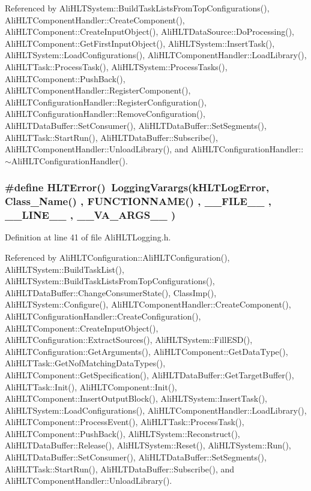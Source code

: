 Referenced by Ali\-HLTSystem::Build\-Task\-Lists\-From\-Top\-Configurations(), Ali\-HLTComponent\-Handler::Create\-Component(), Ali\-HLTComponent::Create\-Input\-Object(), Ali\-HLTData\-Source::Do\-Processing(), Ali\-HLTComponent::Get\-First\-Input\-Object(), Ali\-HLTSystem::Insert\-Task(), Ali\-HLTSystem::Load\-Configurations(), Ali\-HLTComponent\-Handler::Load\-Library(), Ali\-HLTTask::Process\-Task(), Ali\-HLTSystem::Process\-Tasks(), Ali\-HLTComponent::Push\-Back(), Ali\-HLTComponent\-Handler::Register\-Component(), Ali\-HLTConfiguration\-Handler::Register\-Configuration(), Ali\-HLTConfiguration\-Handler::Remove\-Configuration(), Ali\-HLTData\-Buffer::Set\-Consumer(), Ali\-HLTData\-Buffer::Set\-Segments(), Ali\-HLTTask::Start\-Run(), Ali\-HLTData\-Buffer::Subscribe(), Ali\-HLTComponent\-Handler::Unload\-Library(), and Ali\-HLTConfiguration\-Handler::$\sim$Ali\-HLTConfiguration\-Handler().
\subsubsection{\setlength{\rightskip}{0pt plus 5cm}\#define HLTError()\ Logging\-Varargs(k\-HLTLog\-Error,     Class\_\-Name() , FUNCTIONNAME() , \_\-\_\-FILE\_\-\_\- , \_\-\_\-LINE\_\-\_\- , \_\-\_\-VA\_\-ARGS\_\-\_\- )}\label{AliHLTLogging_8h_a6}




Definition at line 41 of file Ali\-HLTLogging.h.

Referenced by Ali\-HLTConfiguration::Ali\-HLTConfiguration(), Ali\-HLTSystem::Build\-Task\-List(), Ali\-HLTSystem::Build\-Task\-Lists\-From\-Top\-Configurations(), Ali\-HLTData\-Buffer::Change\-Consumer\-State(), Class\-Imp(), Ali\-HLTSystem::Configure(), Ali\-HLTComponent\-Handler::Create\-Component(), Ali\-HLTConfiguration\-Handler::Create\-Configuration(), Ali\-HLTComponent::Create\-Input\-Object(), Ali\-HLTConfiguration::Extract\-Sources(), Ali\-HLTSystem::Fill\-ESD(), Ali\-HLTConfiguration::Get\-Arguments(), Ali\-HLTComponent::Get\-Data\-Type(), Ali\-HLTTask::Get\-Nof\-Matching\-Data\-Types(), Ali\-HLTComponent::Get\-Specification(), Ali\-HLTData\-Buffer::Get\-Target\-Buffer(), Ali\-HLTTask::Init(), Ali\-HLTComponent::Init(), Ali\-HLTComponent::Insert\-Output\-Block(), Ali\-HLTSystem::Insert\-Task(), Ali\-HLTSystem::Load\-Configurations(), Ali\-HLTComponent\-Handler::Load\-Library(), Ali\-HLTComponent::Process\-Event(), Ali\-HLTTask::Process\-Task(), Ali\-HLTComponent::Push\-Back(), Ali\-HLTSystem::Reconstruct(), Ali\-HLTData\-Buffer::Release(), Ali\-HLTSystem::Reset(), Ali\-HLTSystem::Run(), Ali\-HLTData\-Buffer::Set\-Consumer(), Ali\-HLTData\-Buffer::Set\-Segments(), Ali\-HLTTask::Start\-Run(), Ali\-HLTData\-Buffer::Subscribe(), and Ali\-HLTComponent\-Handler::Unload\-Library().

